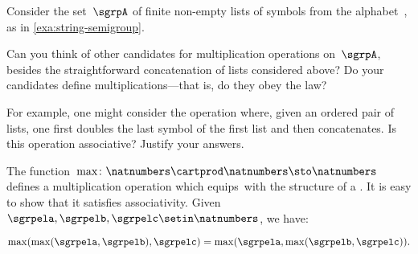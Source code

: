 
\begin{gradedexercise}
    \label{ex:VariationsOnConcatenation}
    \label{ex:alphabet}
    Consider the set~$\sgrpA$ of finite non-empty lists of symbols from the alphabet~\setA, as in \cref{exa:string-semigroup}.

    Can you think of other candidates for multiplication operations on~$\sgrpA$, besides the straightforward concatenation of lists considered above?
    Do your candidates define  multiplications---that is, do they obey the  law?

    For example, one might consider the operation where, given an ordered pair of lists, one first doubles the last symbol of the first list and then concatenates.
    Is this operation associative?
    Justify your answers.
\end{gradedexercise}

\begin{example}
    \label{max-semigroup}

    The function~$\max \colon \natnumbers \cartprod \natnumbers \sto \natnumbers$ defines a multiplication operation which equips~\natnumbers with the structure of a .
    It is easy to show that it satisfies associativity.
    Given~$\sgrpela,\sgrpelb,\sgrpelc\setin \natnumbers$, we have:

    \begin{equation}
        \label{eq:max-assoc}
        \max(\max(\sgrpela,\sgrpelb),\sgrpelc)
        =
        \max(\sgrpela,\max(\sgrpelb,\sgrpelc)).
    \end{equation}
\end{example}

